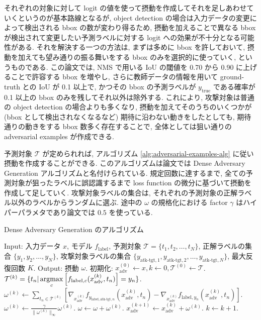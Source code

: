 それぞれの対象に対して logit の値を使って摂動を作成してそれを足しあわせていくというのが基本路線となるが, object detection の場合は入力データの変更によって検出される bbox の数が変わり得るため, 摂動を加えることで異なる bbox が検出されて変更したい予測ラベルに対する logit への効果が不十分となる可能性がある.
それを解決する一つの方法は, まずは多めに bbox を許しておいて, 摂動を加えても望み通りの振る舞いをする bbox のみを選択的に使っていく, というものである.
この論文では, NMS で用いる IoU の閾値を 0.70 から 0.90 に上げることで許容する bbox を増やし, さらに教師データの情報を用いて ground-truth との IoU が 0.1 以上で, かつその bbox の予測ラベルが $y_{\text{true}}$ である確率が 0.1 以上の bbox のみを残してそれ以外は除外する.
これにより, 攻撃対象は普通の object detection の場合よりも多くなり, 摂動を加えてそのうちのいくつかが (bbox として検出されなくなるなど) 期待に沿わない動きをしたとしても, 期待通りの動きをする bbox 数多く存在することで, 全体としては狙い通りの adversarial examples が作成できる.

予測対象 $\mathcal{T}$ が定められれば, アルゴリズム \ref{alg:adversarial-examples-alg} に従い摂動を作成することができる.
このアルゴリズムは論文では Dense Adversary Generation アルゴリズムと名付けられている.
規定回数に達するまで, 全ての予測対象が狙ったラベルに誤認識するまで loss function の微分に基づいて摂動を作成して足していく.
攻撃対象ラベルの集合は, それぞれの予測対象の正解ラベル以外のラベルからランダムに選ぶ.
途中の $\omega$ の規格化における factor $\gamma$ はハイパーパラメタであり論文では $0.5$ を使っている.
%
\begin{algorithm}
\caption{Dense Adversary Generation のアルゴリズム}
\label{alg:adversarial-examples-alg}
\begin{algorithmic}[1]
    \State Input: 入力データ $x$, モデル $f_{\text{label}}$, 予測対象 $\mathcal{T} = \{t_1, t_2, \dots, t_N\}$, 正解ラベルの集合 $\{y_1, y_2, \dots , y_N\}$, 攻撃対象ラベルの集合 $\{y_{\text{atk-tgt}, 1}, y_{\text{atk-tgt}, 2}, \dots , y_{\text{atk-tgt}, N}\}$, 最大反復回数 $K$.
    \State Output: 摂動 $\omega$.
    \State 初期化: $x_{\text{adv}}^{(0)} \leftarrow x, k \leftarrow 0, \mathcal{T}^{(0)} \leftarrow \mathcal{T}$.
    \State $\mathcal{T}^{(k)} = \{ t_n | \mathop{\rm argmax}\limits_{c} \left[ f_{\text{label}, c} (x_{\text{adv}}^{(k)}, t_n) \right] = y_n \}$.
    \State $\omega^{(k)} \leftarrow \sum_{t_n \in \mathcal{T}^{(k)}} \left[ \nabla_{x_{\text{adv}}^{(k)}} f_{y_{\text{label}, \text{atk-tgt}, n}} (x_{\text{adv}}^{(k)}, t_n) - \nabla_{x_{\text{adv}}^{(k)}} f_{\text{label}, y_{n}} (x_{\text{adv}}^{(k)}, t_n) \right]$.
    \State $\omega^{(k)} \leftarrow \frac{\gamma}{\| \omega^{(k)} \|_\infty} \omega^{(k)}$.
    \State $\omega \leftarrow \omega + \omega^{(k)}$.
    \State $x_{\text{adv}}^{(k + 1)} \leftarrow x_{\text{adv}}^{(k)} + \omega^{(k)}$.
    \State $k \leftarrow k + 1$.
    \EndWhile
\end{algorithmic} 
\end{algorithm} 
%

